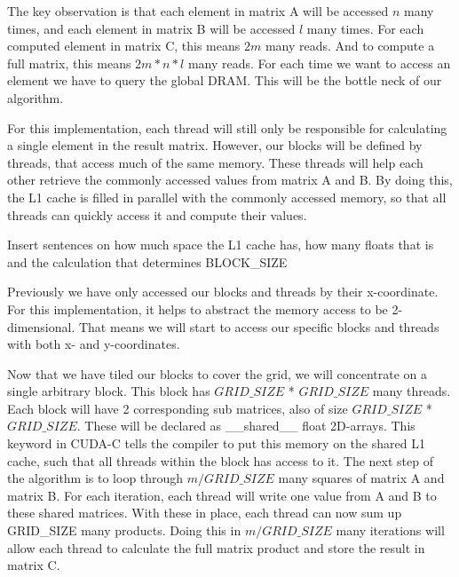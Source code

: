 The key observation is that each element in matrix A will be accessed $n$ many times, and each element in matrix B will be accessed $l$ many times. For each computed element in matrix C, this means $2m$ many reads. And to compute a full matrix, this means $2m * n * l$ many reads. For each time we want to access an element we have to query the global DRAM. This will be the bottle neck of our algorithm. 

For this implementation, each thread will still only be responsible for calculating a single element in the result matrix. However, our blocks will be defined by threads, that access much of the same memory. These threads will help each other retrieve the commonly accessed values from matrix A and B. By doing this, the L1 cache is filled in parallel with the commonly accessed memory, so that all threads can quickly access it and compute their values. 


\color{red} Insert sentences on how much space the L1 cache has, how many floats that is and the calculation that determines BLOCK\_SIZE \color{black}

Previously we have only accessed our blocks and threads by their x-coordinate. For this implementation, it helps to abstract the memory access to be 2-dimensional. That means we will start to access our specific blocks and threads with both x- and y-coordinates. 

Now that we have tiled our blocks to cover the grid, we will concentrate on a single arbitrary block. This block has $GRID\_SIZE$ * $GRID\_SIZE$ many threads. Each block will have 2 corresponding sub matrices, also of size $GRID\_SIZE$ * $GRID\_SIZE$. These will be declared as \_\_shared\_\_ float 2D-arrays. This keyword in CUDA-C tells the compiler to put this memory on the shared L1 cache, such that all threads within the block has access to it. 
The next step of the algorithm is to loop through $m / GRID\_SIZE$ many squares of matrix A and matrix B. For each iteration, each thread will write one value from A and B to these shared matrices. With these in place, each thread can now sum up GRID\_SIZE many products. Doing this in $m / GRID\_SIZE$ many iterations will allow each thread to calculate the full matrix product and store the result in matrix C. 

